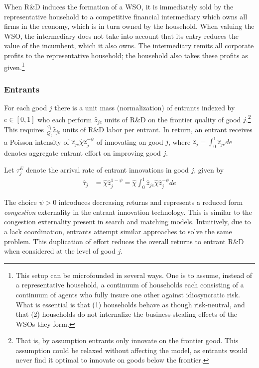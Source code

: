 \documentclass[11pt,english]{article}
\begin{document}
When R\&D induces the formation of a WSO, it is immediately sold by the representative household to a competitive financial intermediary which owns all firms in the economy, which is in turn owned by the household. When valuing the WSO, the intermediary does not take into account that its entry reduces the value of the incumbent, which it also owns. The intermediary remits all corporate profits to the representative household; the household also takes these profits as given.\footnote{This setup can be microfounded in several ways. One is to assume, instead of a representative household, a continuum of households each consisting of a continuum of agents who fully insure one other against idiosyncratic risk. What is essential is that (1) households behave as though risk-neutral, and that (2) households do not internalize the business-stealing effects of the WSOs they form.} 



\subsubsection{Entrants} \label{subsubsec:entrants}

For each good $j$ there is a unit mass (normalization) of entrants indexed by $e \in [0,1]$ who each perform $\hat{z}_{je}$ units of R\&D on the frontier quality of good $j$.\footnote{That is, by assumption entrants only innovate on the frontier good. This assumption could be relaxed without affecting the model, as entrants would never find it optimal to innovate on goods below the frontier.} This requires $\frac{q_j}{Q_t}\hat{z}_{je}$ units of R\&D labor per entrant. In return, an entrant receives a Poisson intensity of $\hat{z}_{je} \hat{\chi} \hat{z}_j^{-\psi}$ of innovating on good $j$, where $\hat{z}_j = \int_0^1 \hat{z}_{je} de$ denotes aggregate entrant effort on improving good $j$. 

Let $\tau_j^E$ denote the arrival rate of entrant innovations in good $j$, given by
\begin{align}\label{model:entrantsInnovationTechnology}
	\hat{\tau}_j &= \hat{\chi} \hat{z}_j^{1-\psi} = \hat{\chi} \int_0^1 \hat{z}_{je} \hat{\chi} \hat{z}_j^{-\psi} de 
\end{align}

The choice $\psi > 0$ introduces decreasing returns and represents a reduced form \textit{congestion} externality in the entrant innovation technology. This is similar to the congestion externality present in search and matching models. Intuitively, due to a lack coordination, entrants attempt similar approaches to solve the same problem. This duplication of effort reduces the overall returns to entrant R\&D when considered at the level of good $j$.
\end{document}
